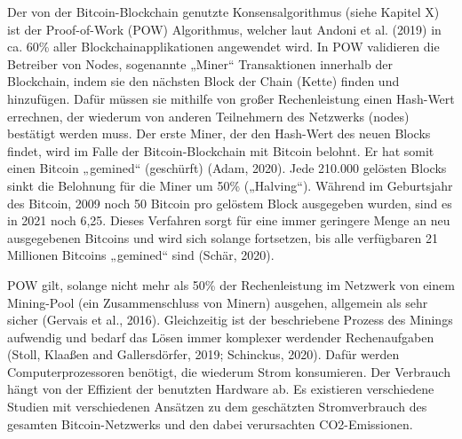 Der von der Bitcoin-Blockchain genutzte Konsensalgorithmus (siehe Kapitel X) ist der Proof-of-Work (POW) Algorithmus, welcher laut Andoni et al. (2019) in ca. 60\% aller Blockchainapplikationen angewendet wird.  In POW validieren die Betreiber von Nodes, sogenannte „Miner“ Transaktionen innerhalb der Blockchain, indem sie den nächsten Block der Chain (Kette) finden und hinzufügen. Dafür müssen sie mithilfe von großer Rechenleistung einen Hash-Wert errechnen, der wiederum von anderen Teilnehmern des Netzwerks (nodes) bestätigt werden muss. Der erste Miner, der den Hash-Wert des neuen Blocks findet, wird im Falle der Bitcoin-Blockchain mit Bitcoin belohnt. Er hat somit einen Bitcoin „gemined“ (geschürft) (Adam, 2020). Jede 210.000 gelösten Blocks sinkt die Belohnung für die Miner um 50\% („Halving“). Während im Geburtsjahr des Bitcoin, 2009 noch 50 Bitcoin pro gelöstem Block ausgegeben wurden, sind es in 2021 noch 6,25. Dieses Verfahren sorgt für eine immer geringere Menge an neu ausgegebenen Bitcoins und wird sich solange fortsetzen, bis alle verfügbaren 21 Millionen Bitcoins „gemined“ sind (Schär, 2020). 

POW gilt, solange nicht mehr als 50\% der Rechenleistung im Netzwerk von einem Mining-Pool (ein Zusammenschluss von Minern) ausgehen, allgemein als sehr sicher (Gervais et al., 2016). Gleichzeitig ist der beschriebene Prozess des Minings aufwendig und bedarf das Lösen immer komplexer werdender Rechenaufgaben (Stoll, Klaaßen and Gallersdörfer, 2019; Schinckus, 2020). Dafür werden Computerprozessoren benötigt, die wiederum Strom konsumieren. Der Verbrauch hängt von der Effizient der benutzten Hardware ab. Es existieren verschiedene Studien mit verschiedenen Ansätzen zu dem geschätzten Stromverbrauch des gesamten Bitcoin-Netzwerks und den dabei verursachten CO2-Emissionen. 
\newline

